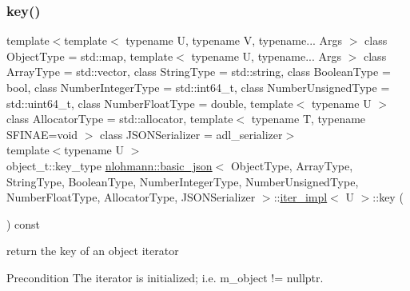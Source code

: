 \subsubsection{\texorpdfstring{key()}{key()}}
{\footnotesize\ttfamily template$<$template$<$ typename U, typename V, typename... Args $>$ class Object\+Type = std\+::map, template$<$ typename U, typename... Args $>$ class Array\+Type = std\+::vector, class String\+Type  = std\+::string, class Boolean\+Type  = bool, class Number\+Integer\+Type  = std\+::int64\+\_\+t, class Number\+Unsigned\+Type  = std\+::uint64\+\_\+t, class Number\+Float\+Type  = double, template$<$ typename U $>$ class Allocator\+Type = std\+::allocator, template$<$ typename T, typename S\+F\+I\+N\+A\+E=void $>$ class J\+S\+O\+N\+Serializer = adl\+\_\+serializer$>$ \\
template$<$typename U $>$ \\
object\+\_\+t\+::key\+\_\+type \hyperlink{classnlohmann_1_1basic__json}{nlohmann\+::basic\+\_\+json}$<$ Object\+Type, Array\+Type, String\+Type, Boolean\+Type, Number\+Integer\+Type, Number\+Unsigned\+Type, Number\+Float\+Type, Allocator\+Type, J\+S\+O\+N\+Serializer $>$\+::\hyperlink{classnlohmann_1_1basic__json_1_1iter__impl}{iter\+\_\+impl}$<$ U $>$\+::key (\begin{DoxyParamCaption}{ }\end{DoxyParamCaption}) const\hspace{0.3cm}{\ttfamily [inline]}}



return the key of an object iterator 

\begin{DoxyPrecond}{Precondition}
The iterator is initialized; i.\+e. {\ttfamily m\+\_\+object != nullptr}. 
\end{DoxyPrecond}
\mbox{\label{classnlohmann_1_1basic__json_1_1iter__impl_af1963645f99993ac5d0d2f8516e07212}} 
